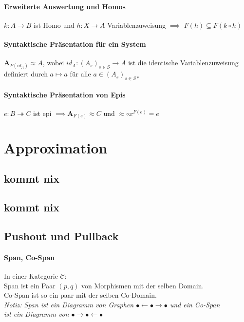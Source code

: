 \paragraph{ Erweiterte Auswertung und Homos}
$k: A \rightarrow B$ ist Homo und $h: X \rightarrow A$ Variablenzuweisung $\implies $ $F(h) \subseteq F(k \circ h)$

\paragraph{ Syntaktische Präsentation für ein System}
$\mathbf{A}_{F(id_A)} \approx A$, wobei $id_A: (A_s)_{s \in S} \rightarrow A$ ist die identische Variablenzuweisung definiert durch $a \mapsto a$ für alle $a \in (A_s)_{s \in S*}$

\paragraph{ Syntaktische Präsentation von Epis}
$e: B \twoheadrightarrow C$ ist epi $\implies \mathbf{A}_{F(e)} \approx C$ und $\approx \circ x^{F(e)} = e$


\section{Approximation}
\subsection{kommt nix}
\subsection{kommt nix}
\subsection{Pushout und Pullback}

\paragraph{ Span, Co-Span}
In einer Kategorie $\mathcal{C}$: \\Span ist ein Paar $(p,q)$ von Morphismen mit der selben Domain. \\
Co-Span ist so ein paar mit der selben Co-Domain. \\ 
 \emph{Notiz: Span ist ein Diagramm von Graphen $\bullet \leftarrow \bullet \rightarrow \bullet$ und ein Co-Span \\ ist ein Diagramm von $\bullet \rightarrow  \bullet \leftarrow \bullet$ }

